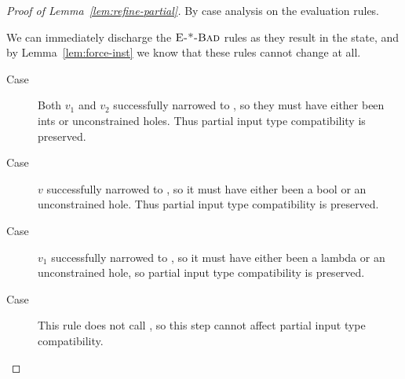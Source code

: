 \begin{proof}[Proof of Lemma~\ref{lem:refine-partial}]
  By case analysis on the evaluation rules.

  We can immediately discharge the $\textsc{E-*-Bad}$ rules as they
  result in the \stuck state, and by Lemma~\ref{lem:force-inst} we know
  that these rules cannot change  at all.




  \begin{description}
  \item[Case \replusgood] Both $v_1$ and $v_2$ successfully narrowed to
    \tint, so they must have either been ints or unconstrained
    holes. Thus partial input type compatibility is preserved.

  \item[Case ] $v$ successfully narrowed to
    \tbool, so it must have either been a bool or an unconstrained hole.
    Thus partial input type compatibility is preserved.

  \item[Case \reappgood] $v_1$ successfully narrowed to \tfun, so it
    must have either been a lambda or an unconstrained hole, so partial
    input type compatibility is preserved.

  \item[Case \releafgood] This rule does not call \forcesym, so this
    step cannot affect partial input type compatibility.


\end{description}
\end{proof}
